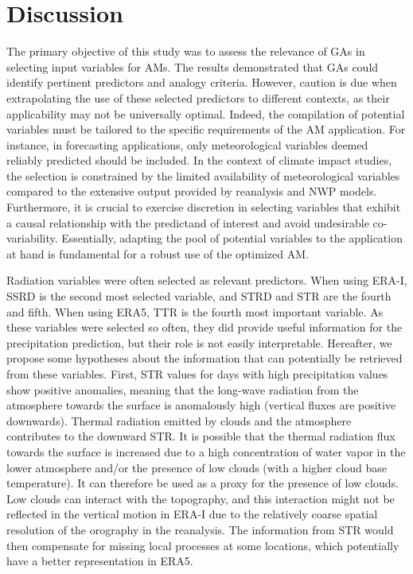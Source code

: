 \documentclass[draft]{agujournal2019}
\begin{document}
\section{Discussion}
\label{discussion}

The primary objective of this study was to assess the relevance of GAs in selecting input variables for AMs. The results demonstrated that GAs could identify pertinent predictors and analogy criteria. However, caution is due when extrapolating the use of these selected predictors to different contexts, as their applicability may not be universally optimal. Indeed, the compilation of potential variables must be tailored to the specific requirements of the AM application. For instance, in forecasting applications, only meteorological variables deemed reliably predicted should be included. In the context of climate impact studies, the selection is constrained by the limited availability of meteorological variables compared to the extensive output provided by reanalysis and NWP models. Furthermore, it is crucial to exercise discretion in selecting variables that exhibit a causal relationship with the predictand of interest and avoid undesirable co-variability. Essentially, adapting the pool of potential variables to the application at hand is fundamental for a robust use of the optimized AM.

Radiation variables were often selected as relevant predictors. When using ERA-I, SSRD is the second most selected variable, and STRD and STR are the fourth and fifth. When using ERA5, TTR is the fourth most important variable. As these variables were selected so often, they did provide useful information for the precipitation prediction, but their role is not easily interpretable. Hereafter, we propose some hypotheses about the information that can potentially be retrieved from these variables. First, STR values for days with high precipitation values show positive anomalies, meaning that the long-wave radiation from the atmosphere towards the surface is anomalously high (vertical fluxes are positive downwards). Thermal radiation emitted by clouds and the atmosphere contributes to the downward STR. It is possible that the thermal radiation flux towards the surface is increased due to a high concentration of water vapor in the lower atmosphere and/or the presence of low clouds (with a higher cloud base temperature). It can therefore be used as a proxy for the presence of low clouds. Low clouds can interact with the topography, and this interaction might not be reflected in the vertical motion in ERA-I due to the relatively coarse spatial resolution of the orography in the reanalysis. The information from STR would then compensate for missing local processes at some locations, which potentially have a better representation in ERA5.
\end{document}
